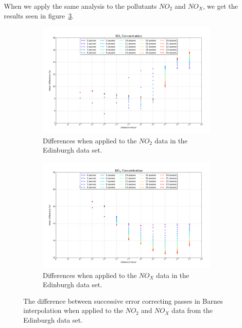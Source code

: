         	When we apply the same analysis to the pollutants $NO_{2}$ and $NO_{X}$, we get the results seen in figure~\ref{fig:barnes_distance_factor_results_NO2_NOx}. 

        	\begin{figure}
                \centering
                \begin{subfigure}{\textwidth}
                    \centering
                    \includegraphics[width=\linewidth]{./images/Barnes_Distance_Factor_NO2.png}
                    \caption{Differences when applied to the $NO_{2}$ data in the Edinburgh data set.}
                    \label{fig:barnes_distance_factor_results_NO2}
                \end{subfigure}
                \begin{subfigure}{\textwidth}
                    \includegraphics[width=\linewidth]{./images/Barnes_Distance_Factor_NOx.png}
                    \caption{Differences when applied to the $NO_{X}$ data in the Edinburgh data set.}
                    \label{fig:barnes_distance_factor_results_NOx}
                \end{subfigure}
                \caption{The difference between successive error correcting passes in Barnes interpolation when applied to the $NO_{2}$ and $NO_{X}$ data from the Edinburgh data set.}
                \label{fig:barnes_distance_factor_results_NO2_NOx}
            \end{figure}


